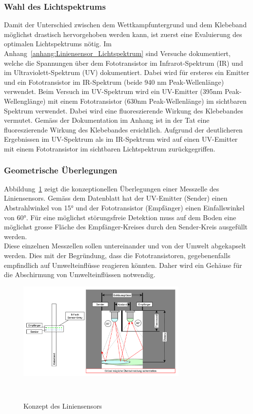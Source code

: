 \documentclass[main.tex]{subfiles} %
\begin{document}
\subsubsection*{Wahl des Lichtspektrums}
Damit der Unterschied zwischen dem Wettkampfuntergrund und dem Klebeband möglichst 
drastisch hervorgehoben werden kann, ist zuerst eine Evaluierung des optimalen
Lichtspektrums nötig. Im Anhang~\ref{anhang:Liniensensor_Lichtspektrum} sind Versuche dokumentiert, welche die Spannungen 
über dem Fototransistor im Infrarot-Spektrum (IR) und im Ultraviolett-Spektrum (UV) 
dokumentiert. Dabei wird für ersteres ein Emitter und ein Fototransistor im IR-Spektrum (beide 940 nm Peak-Wellenlänge)
verwendet. Beim Versuch im UV-Spektrum wird ein UV-Emitter (395nm Peak-Wellenglänge) mit einem Fototransistor (630nm Peak-Wellenlänge) 
im sichtbaren Spektrum verwendet. Dabei wird eine fluoreszierende Wirkung des Klebebandes 
vermutet. Gemäss der Dokumentation im Anhang ist in der Tat eine fluoreszierende Wirkung des Klebebandes 
ersichtlich. Aufgrund der deutlicheren Ergebnissen im UV-Spektrum als im IR-Spektrum wird auf einen 
UV-Emitter mit einem Fototransistor im sichtbaren Lichtspektrum zurückgegriffen.


\subsubsection*{Geometrische Überlegungen}
Abbildung~\ref{fig:Konzept_graphml} zeigt die konzeptionellen Überlegungen einer Messzelle des
Liniensensors. Gemäss dem Datenblatt hat der UV-Emitter (Sender) einen Abstrahlwinkel von 15° und der
Fototransistor (Empfänger) einen Einfallswinkel von 60°. Für eine möglichst störungsfreie Detektion muss auf dem Boden 
eine möglichst grosse Fläche des Empfänger-Kreises durch den Sender-Kreis ausgefüllt werden.\\
Diese einzelnen Messzellen sollen untereinander und von der Umwelt abgekapselt werden. Dies
mit der Begründung, dass die Fototransistoren, gegebenenfalls empfindlich auf
Umwelteinflüsse reagieren könnten. Daher wird ein Gehäuse für die Abschirmung von Umwelteinflüssen
notwendig.

\begin{figure}[H]
    \centering
    \includegraphics[width=0.75\textwidth]{fig_Strecke_Tracken/Konzept.pdf}
    \caption{Konzept des Liniensensors}~\label{fig:Konzept_graphml}
\end{figure}
\end{document}
